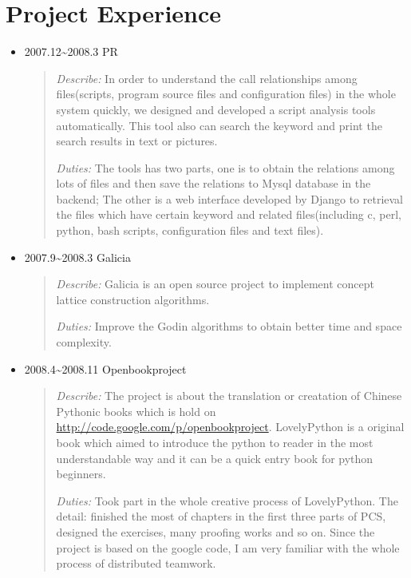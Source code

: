 \documentclass[a4paper,10pt,english]{manual}
\begin{document}
\section{Project Experience}
\begin{itemize}
\item {} 
2007.12\textasciitilde{}2008.3 PR
\begin{quote}
\emph{Describe:} In order to understand the call relationships among files(scripts, program source files and configuration files) in the whole system quickly, we designed and developed a script analysis tools automatically. This tool also can search the keyword and print the search results in text or pictures.

\emph{Duties:} The tools has two parts, one is to obtain the relations among lots of files and then save the relations to Mysql database in the backend; The other is a web interface developed by Django to retrieval the files which have certain keyword and related files(including c, perl, python, bash scripts, configuration files and text files).
\end{quote}

\item {} 
2007.9\textasciitilde{}2008.3 Galicia
\begin{quote}

\emph{Describe:} Galicia is an open source project to implement concept lattice construction algorithms.

\emph{Duties:} Improve the Godin algorithms to obtain better time and space complexity.
\end{quote}

\item {} 
2008.4\textasciitilde{}2008.11 Openbookproject
\begin{quote}

\emph{Describe:} The project is about the translation or creatation of Chinese Pythonic books which is hold on \href{http://code.google.com/p/openbookproject/}{http://code.google.com/p/openbookproject}. LovelyPython is a original book which aimed to introduce the python to reader in the most understandable way and it can be a quick entry book for python beginners.

\emph{Duties:} Took part in the whole creative process of LovelyPython. The detail: finished the most of chapters in the first three parts of PCS,  designed the exercises, many proofing works and so on. Since the project is based on the google code, I am very familiar with the whole process of distributed teamwork.
\end{quote}


\end{itemize}
\end{document}
